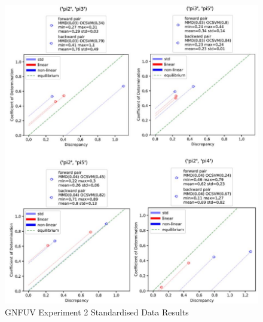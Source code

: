 \documentclass{mpaper}
\begin{document}
\begin{figure}
    \begin{center}
        \includegraphics[scale = 0.5]{experiment_2_std.jpg}
    \end{center}
    \caption{GNFUV Experiment 2 Standardised Data Results}
    \label{fig:gnfuv_exp2_std}
\end{figure}
\end{document}

